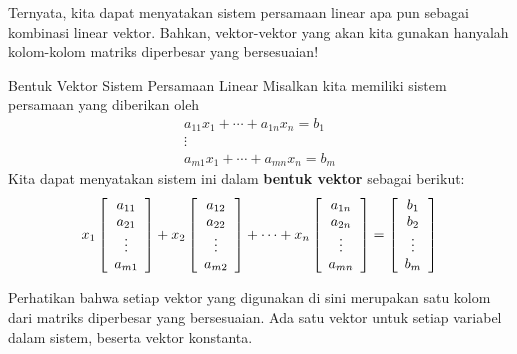 Ternyata, kita dapat menyatakan sistem persamaan linear apa pun sebagai kombinasi linear vektor. Bahkan,
vektor-vektor yang akan kita gunakan hanyalah kolom-kolom matriks diperbesar yang bersesuaian! 

\begin{definition}{Bentuk Vektor Sistem Persamaan Linear}\label{def:vectorform}
Misalkan kita memiliki sistem persamaan yang diberikan oleh
\begin{equation*}
\begin{array}{c}
a_{11}x_{1}+\cdots +a_{1n}x_{n}=b_{1} \\
\vdots \\
a_{m1}x_{1}+\cdots +a_{mn}x_{n}=b_{m}
\end{array}
\end{equation*}
Kita dapat menyatakan sistem ini dalam \textbf{bentuk vektor}  sebagai berikut:
\begin{equation*}
x_1
\left[
\begin{array}{c}
a_{11}\\
a_{21}\\
\vdots \\
a_{m1}
\end{array}
\right]
+
x_2
\left[
\begin{array}{c}
a_{12}\\
a_{22}\\
\vdots \\
a_{m2}
\end{array}
\right]
+
\cdots
+
x_n
\left[
\begin{array}{c}
a_{1n}\\
a_{2n}\\
\vdots \\
a_{mn}
\end{array}
\right]
=
\left[
\begin{array}{c}
b_1\\
b_2\\
\vdots \\
b_m
\end{array}
\right]
\end{equation*}
\end{definition}

Perhatikan bahwa setiap vektor yang digunakan di sini merupakan satu kolom dari matriks diperbesar yang bersesuaian. Ada satu vektor untuk setiap variabel dalam sistem,
beserta vektor konstanta. 

